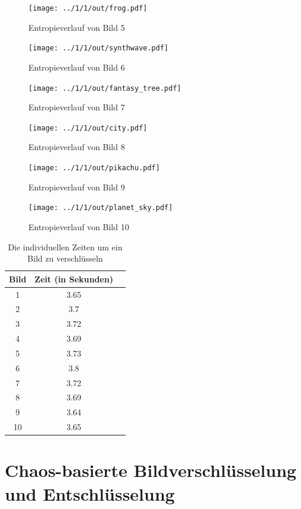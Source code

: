 \begin{figure}
	\centering
	\texttt{[image: ../1/1/out/frog.pdf]}
	\caption{Entropieverlauf von Bild 5}
\end{figure}

\begin{figure}
	\centering
	\texttt{[image: ../1/1/out/synthwave.pdf]}
	\caption{Entropieverlauf von Bild 6}
\end{figure}

\begin{figure}
	\centering
	\texttt{[image: ../1/1/out/fantasy\_tree.pdf]}
	\caption{Entropieverlauf von Bild 7}
\end{figure}

\begin{figure}
	\centering
	\texttt{[image: ../1/1/out/city.pdf]}
	\caption{Entropieverlauf von Bild 8}
\end{figure}

\begin{figure}
	\centering
	\texttt{[image: ../1/1/out/pikachu.pdf]}
	\caption{Entropieverlauf von Bild 9}
\end{figure}

\begin{figure}
	\centering
	\texttt{[image: ../1/1/out/planet\_sky.pdf]}
	\caption{Entropieverlauf von Bild 10}
	\label{plotend}
\end{figure}

\begin{table}
	\begin{center}
		\begin{tabular}{ |c|c|c| } 
		\hline
		Bild & Zeit (in Sekunden) \\
		\hline
		1 & 3.65 \\
		2 & 3.7 \\
		3 & 3.72\\
		4 & 3.69\\
		5 & 3.73\\
		6 & 3.8\\
		7 & 3.72\\
		8 &  3.69\\
		9 &  3.64\\
		10 & 3.65\\
		\hline
		\end{tabular}
	\end{center}
	\caption{Die individuellen Zeiten um ein Bild zu verschlüsseln}
	\label{tab:time}
\end{table}

\section{Chaos-basierte Bildverschlüsselung und Entschlüsselung}

